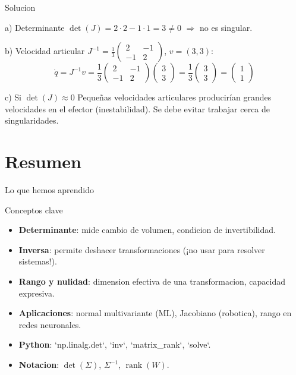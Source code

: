 \documentclass[aspectratio=169, 10pt, xcolor=table]{beamer}
\begin{document}
\begin{frame}{Solucion}
    \begin{block}{a) Determinante}
        $\det(J) = 2\cdot2 - 1\cdot1 = 3 \neq 0$ $\Rightarrow$ no es singular.
    \end{block}
    \begin{block}{b) Velocidad articular}
        $J^{-1} = \frac{1}{3}\begin{pmatrix}2&-1\\-1&2\end{pmatrix}$, $v=(3,3)$:
        \[
        \dot{q} = J^{-1}v = \frac{1}{3}\begin{pmatrix}2&-1\\-1&2\end{pmatrix}\begin{pmatrix}3\\3\end{pmatrix} = \frac{1}{3}\begin{pmatrix}3\\3\end{pmatrix} = \begin{pmatrix}1\\1\end{pmatrix}
        \]
    \end{block}
    \begin{block}{c) Si $\det(J)\approx 0$}
        Pequeñas velocidades articulares producirían grandes velocidades en el efector (inestabilidad). Se debe evitar trabajar cerca de singularidades.
    \end{block}
\end{frame}

\section{Resumen}

\begin{frame}{Lo que hemos aprendido}
    \begin{exampleblock}{Conceptos clave}
        \begin{itemize}
            \item \textbf{Determinante}: mide cambio de volumen, condicion de invertibilidad.
            \item \textbf{Inversa}: permite deshacer transformaciones (¡no usar para resolver sistemas!).
            \item \textbf{Rango y nulidad}: dimension efectiva de una transformacion, capacidad expresiva.
            \item \textbf{Aplicaciones}: normal multivariante (ML), Jacobiano (robotica), rango en redes neuronales.
            \item \textbf{Python}: `np.linalg.det`, `inv`, `matrix_rank`, `solve`.
            \item \textbf{Notacion}: $\det(\Sigma)$, $\Sigma^{-1}$, $\operatorname{rank}(W)$.
        \end{itemize}
    \end{exampleblock}
\end{frame}
\end{document}
